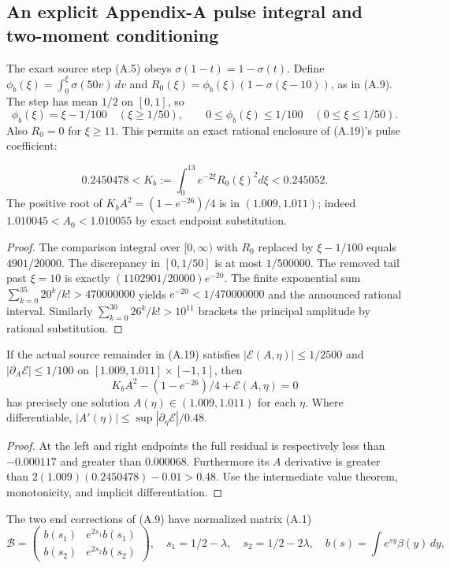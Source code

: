 \subsection*{An explicit Appendix-A pulse integral and two-moment conditioning}
The exact source step (A.5) obeys $\sigma(1-t)=1-\sigma(t)$. Define
$\phi_b(\xi)=\int_0^\xi \sigma(50v)\,dv$ and
$R_0(\xi)=\phi_b(\xi)(1-\sigma(\xi-10))$, as in
(A.9). The step has mean $1/2$ on $[0,1]$, so
\[
\phi_b(\xi)=\xi-1/100\quad(\xi\ge1/50),
\qquad 0\le\phi_b(\xi)\le1/100\quad(0\le\xi\le1/50).
\]
Also $R_0=0$ for $\xi\ge11$. This permits an exact
rational enclosure of (A.19)'s pulse coefficient:
\begin{proposition}
\[
0.2450478<K_b:=\int_0^{13}e^{-2\xi}R_0(\xi)^2d\xi<0.245052.
\]
The positive root of $K_bA^2=(1-e^{-26})/4$ is in $(1.009,1.011)$;
indeed $1.010045<A_0<1.010055$ by exact endpoint substitution.
\end{proposition}
\begin{proof}
The comparison integral over $[0,\infty)$ with
$R_0$ replaced by $\xi-1/100$ equals $4901/20000$.
The discrepancy in $[0,1/50]$ is at most
$1/500000$. The removed tail past $\xi=10$ is exactly
$(1102901/20000)e^{-20}$. The finite exponential sum
$\sum_{k=0}^{35}20^k/k!>470000000$ yields
$e^{-20}<1/470000000$ and the announced rational interval.
Similarly $\sum_{k=0}^{30}26^k/k!>10^{11}$ brackets the principal
amplitude by rational substitution.
\end{proof}
\begin{proposition}
If the actual source remainder in (A.19) satisfies
$|\mathcal E(A,\eta)|\le1/2500$ and
$|\partial_A\mathcal E|\le1/100$ on
$[1.009,1.011]\times[-1,1]$, then
\[
K_bA^2-(1-e^{-26})/4+\mathcal E(A,\eta)=0
\]
has precisely one solution $A(\eta)\in(1.009,1.011)$ for each $\eta$.
Where differentiable, $|A'(\eta)|\le\sup|\partial_\eta\mathcal E|/0.48$.
\end{proposition}
\begin{proof}
At the left and right endpoints the full residual is respectively
less than $-0.000117$ and greater than $0.000068$.
Furthermore its $A$ derivative is greater than
$2(1.009)(0.2450478)-0.01>0.48$.
Use the intermediate value theorem, monotonicity, and implicit
differentiation.
\end{proof}
The two end corrections of (A.9) have normalized matrix (A.1)
\[
\mathcal B=\begin{pmatrix}b(s_1)&e^{2s_1}b(s_1)\\
b(s_2)&e^{2s_2}b(s_2)\end{pmatrix},
\quad s_1=1/2-\lambda,\quad s_2=1/2-2\lambda,
\quad b(s)=\int e^{sy}\beta(y)\,dy,
\]

